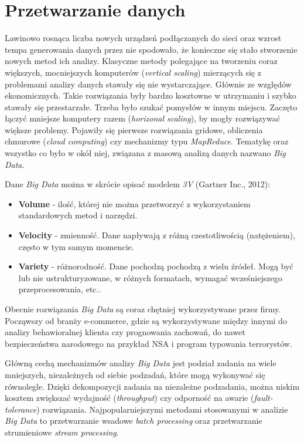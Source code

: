 \section{Przetwarzanie danych}

Lawinowo rosnąca liczba nowych urządzeń podłączanych do sieci
oraz wzrost tempa generowania danych przez nie spodowało,
że konieczne się stało stworzenie nowych metod ich analizy.
Klasyczne metody polegające na tworzeniu coraz większych,
mocniejszych komputerów (\textit{vertical scaling})
mierzących się z problemami analizy danych stawały się nie wystarczające.
Głównie ze względów ekonomicznych.
Takie rozwiązania były bardzo kosztowne w utrzymaniu i szybko stawały się przestarzałe.
Trzeba było szukać pomysłów w innym miejscu.
Zaczęto łączyć mniejsze komputery razem (\textit{horizonal scaling}),
by mogły rozwiązywać większe problemy.
Pojawiły się pierwsze rozwiązania gridowe,
obliczenia chmurowe (\textit{cloud computing})
czy mechanizmy typu \textit{MapReduce}.
Tematykę oraz wszystko co było w okół niej,
związana z masową analizą danych nazwano \textit{Big Data}.

Dane \textit{Big Data} można w skrócie opisać modelem \textit{3V} (Gartner Inc., 2012):
\begin{itemize}
		\item \textbf{Volume} - ilość,
		której nie można przetworzyć z wykorzystaniem standardowych metod i narzędzi.
		\item \textbf{Velocity} - zmienność.
		Dane napływają z różną czestotliwością (natężeniem),
		często w tym samym momencie.
		\item \textbf{Variety} - różnorodność.
		Dane pochodzą pochodzą z wielu źródeł.
		Mogą być lub nie ustrukturyzowane,
		w różnych formatach,
		wymagać wcześniejszego przeprocesowania,
		etc..
\end{itemize}

Obecnie rozwiązania \textit{Big Data} są coraz chętniej wykorzystywane przez firmy.
Począwszy od branży e-commerce,
gdzie są wykorzystywane między innymi do analizy behawioralnej klienta czy prognowania zachowań,
do nawet bezpieczeństwa narodowego
na przykład NSA i program typowania terrorystów.

Główną cechą mechanizmów analizy \textit{Big Data} jest podział zadania
na wiele mniejszych,
niezależnych od siebie podzadań,
które mogą wykonywać się równolegle.
Dzięki dekompozycji zadania na niezależne podzadania,
można niskim kosztem zwiększać wydajność (\textit{throughput})
czy odporność na awarie (\textit{fault-tolerance}) rozwiązania.
Najpopularniejszymi metodami stosowanymi w analizie \textit{Big Data} to
przetwarzanie wsadowe \textit{batch processing}
oraz przetwarzanie strumieniowe \textit{stream processing}.

